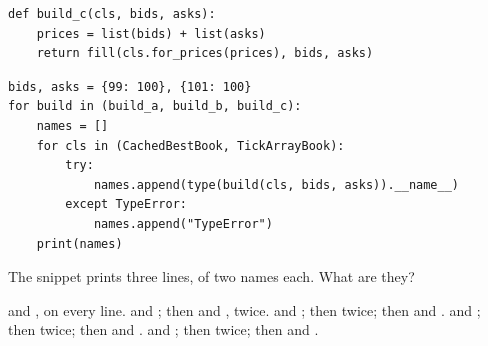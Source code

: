 \begin{question}
\begin{lstlisting}[caption={Three builders}, label=listing.buildingABookOfAGivenClassBuilders]
def build_c(cls, bids, asks):
    prices = list(bids) + list(asks)
    return fill(cls.for_prices(prices), bids, asks)
\end{lstlisting}
\begin{lstlisting}[caption={Each builder, handed each of two classes}, label=listing.buildingABookOfAGivenClassRun]
bids, asks = {99: 100}, {101: 100}
for build in (build_a, build_b, build_c):
    names = []
    for cls in (CachedBestBook, TickArrayBook):
        try:
            names.append(type(build(cls, bids, asks)).__name__)
        except TypeError:
            names.append("TypeError")
    print(names)
\end{lstlisting}
The snippet prints three lines, of two names each.
What are they?
\begin{choices}
 \choice {} and , on every line.
 \choice {} and ;
  then  and , twice.
 \choice {} and ;
  then  twice;
  then  and .
 \correctchoice {} and ;
  then  twice;
  then  and .
 \choice {} and ;
  then  twice;
  then  and .
\end{choices}
\end{question}

